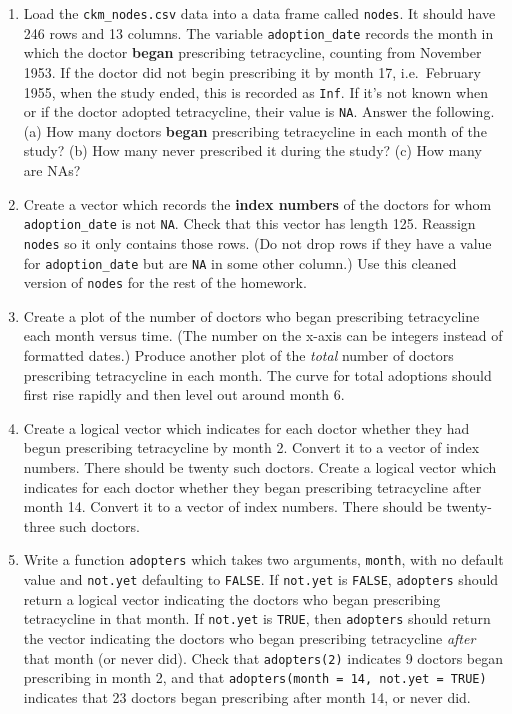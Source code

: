 \documentclass[12pt, leqno]{article}
\begin{document}
\begin{enumerate}

\item Load the \texttt{ckm\_nodes.csv} data into a data frame called \texttt{nodes}.  It should have 246 rows and 13 columns.  The variable \texttt{adoption\_date} records the month in which the doctor \textbf{began} prescribing tetracycline, counting from November 1953.  If the doctor did not begin prescribing it by month 17, i.e.\ February 1955, when the study ended, this is recorded as \texttt{Inf}.  If it's not known when or if the doctor adopted tetracycline, their value is \texttt{NA}.  Answer the following. (a) How many doctors \textbf{began} prescribing tetracycline in each month of the study?  (b) How many never prescribed it during the study? (c) How many are NAs?

\item Create a vector which records the \textbf{index numbers} of the doctors for whom \texttt{adoption\_date} is not \texttt{NA}.  Check that this vector has length 125.  Reassign \texttt{nodes} so it only contains those rows.  (Do not drop rows if they have a value for \texttt{adoption\_date} but are \texttt{NA} in some other column.)  Use this cleaned version of \texttt{nodes} for the rest of the homework.

\item Create a plot of the number of doctors who began prescribing tetracycline each month versus time.  (The number on the x-axis can be integers instead of formatted dates.)  Produce another plot of the \emph{total} number of doctors prescribing tetracycline in each month.  The curve for total adoptions should first rise rapidly and then level out around month 6.

\item Create a logical vector which indicates for each doctor whether they had begun prescribing tetracycline by month 2.  Convert it to a vector of index numbers.  There should be twenty such doctors.  Create a logical vector which indicates for each doctor whether they began prescribing tetracycline after month 14.  Convert it to a vector of index numbers.  There should be twenty-three such doctors.

\item Write a function \texttt{adopters} which takes two arguments, \texttt{month}, with no default value and \texttt{not.yet} defaulting to \texttt{FALSE}.  If \texttt{not.yet} is \texttt{FALSE}, \texttt{adopters} should return a logical vector indicating the doctors who began prescribing tetracycline in that month.  If \texttt{not.yet} is \texttt{TRUE}, then \texttt{adopters} should return the vector indicating the doctors who began prescribing tetracycline \emph{after} that month (or never did).  Check that \texttt{adopters(2)} indicates 9 doctors began prescribing in month 2, and that \texttt{adopters(month = 14, not.yet = TRUE)} indicates that 23 doctors began prescribing after month 14, or never did. 

\end{enumerate}
\end{document}
